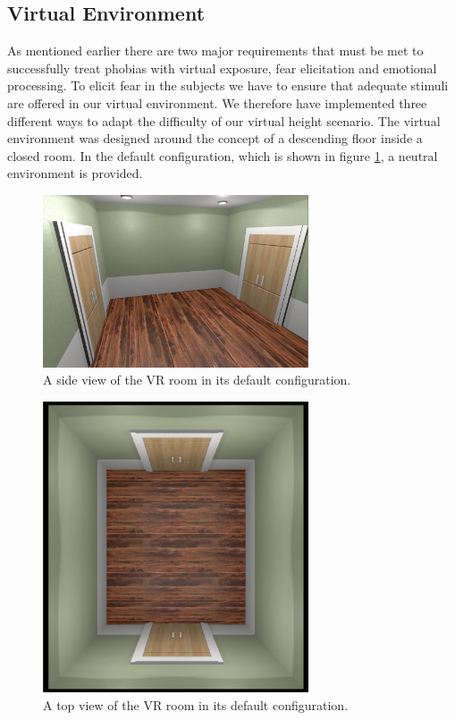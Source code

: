 \subsection{Virtual Environment}
As mentioned earlier there are two major requirements that must be met to successfully treat phobias with virtual exposure, fear elicitation and emotional processing. To elicit fear in the subjects we have to ensure that adequate stimuli are offered in our virtual environment. We therefore have implemented three different ways to adapt the difficulty of our virtual height scenario. The virtual environment was designed around the concept of a descending floor inside a closed room. In the default configuration, which is shown in figure \ref{VRdefaultImg}, a neutral environment is provided.

\begin{figure}[ht]
\centering
\includegraphics[width=0.7\textwidth]{images/RoomDefault.png}
\caption{A side view of the VR room in its default configuration.}
\label{VRdefaultImg}
\end{figure}

\begin{figure}[ht]
\centering
\includegraphics[width=0.7\textwidth]{images/RoomDefaultTop.png}
\caption{A top view of the VR room in its default configuration.}
\label{VRdefaultTopImg}
\end{figure}

